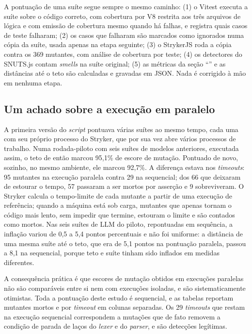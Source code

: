 A pontuação de uma suíte segue sempre o mesmo caminho: (1) o Vitest executa a suíte sobre o código correto, com cobertura por V8 restrita aos três arquivos de lógica e com emissão de cobertura mesmo quando há falhas, e registra quais casos de teste falharam; (2) os casos que falharam são marcados como ignorados numa cópia da suíte, usada apenas na etapa seguinte; (3) o StrykerJS roda a cópia contra os 369 mutantes, com análise de cobertura por teste; (4) os detectores do SNUTS.js contam \textit{smells} na suíte original; (5) as métricas da seção ``'' e as distâncias até o teto são calculadas e gravadas em JSON. Nada é corrigido à mão em nenhuma etapa.

\subsection{Um achado sobre a execução em paralelo}
\label{sec:timeout}

A primeira versão do \textit{script} pontuava várias suítes ao mesmo tempo, cada uma com seu próprio processo do Stryker, que por sua vez abre vários processos de trabalho. Numa rodada-piloto com seis suítes de modelos anteriores, executada assim, o teto de então marcou 95,1\% de escore de mutação. Pontuado de novo, sozinho, no mesmo ambiente, ele marcou 92,7\%. A diferença estava nos \textit{timeouts}: 95 mutantes na execução paralela contra 29 na sequencial; dos 66 que deixaram de estourar o tempo, 57 passaram a ser mortos por asserção e 9 sobreviveram. O Stryker calcula o tempo-limite de cada mutante a partir de uma execução de referência; quando a máquina está sob carga, mutantes que apenas tornam o código mais lento, sem impedir que termine, estouram o limite e são contados como mortos. Nas seis suítes de LLM do piloto, repontuadas em sequência, a inflação variou de 0,5 a 5,4 pontos percentuais e não foi uniforme: a distância de uma mesma suíte até o teto, que era de 5,1 pontos na pontuação paralela, passou a 8,1 na sequencial, porque teto e suíte tinham sido inflados em medidas diferentes.

A consequência prática é que escores de mutação obtidos em execuções paralelas não são comparáveis entre si nem com execuções isoladas, e são sistematicamente otimistas. Toda a pontuação deste estudo é sequencial, e as tabelas reportam mutantes mortos e por \textit{timeout} em colunas separadas. Os 29 \textit{timeouts} que restam na execução sequencial correspondem a mutações que de fato removem a condição de parada de laços do \textit{lexer} e do \textit{parser}, e são detecções legítimas.

